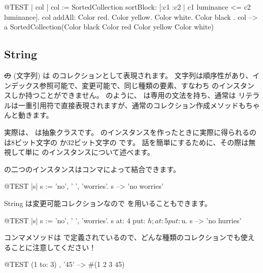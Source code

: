 \documentclass[a4paper,10pt,twoside]{book}
\begin{document}
\begin{code}{@TEST | col |}
col := SortedCollection sortBlock: [:c1 :c2 | c1 luminance <= c2 luminance].
col addAll: { Color red. Color yellow. Color white. Color black }.
col --> a SortedCollection(Color black Color red Color yellow Color white)
\end{code}

\subsection{String}
\st の (文字列) は  のコレクションとして表現されます。
文字列は順序性があり、インデックス参照可能で、変更可能で、同じ種類の要素、すなわち  のインスタンスしか持つことができません。
 のように、 は専用の文法を持ち、通常は  リテラルは一重引用符で直接表現されますが、通常のコレクション作成メソッドもちゃんと動きます。


実際は、 は抽象クラスです。
 のインスタンスを作ったときに実際に得られるのは8ビット文字の  か32ビット文字の  です。
話を簡単にするために、その際は無視して単に  のインスタンスについて述べます。

 の二つのインスタンスはコンマによって結合できます。
\begin{code}{@TEST |s|}
s := 'no', ' ', 'worries'.
s -->  'no worries'
\end{code}

String は変更可能コレクションなので  を用いることもできます。

\begin{code}{@TEST |s| s := 'no', ' ', 'worries'.}
s at: 4 put: $h; at: 5 put: $u.
s --> 'no hurries'
\end{code}

コンマメソッドは  で定義されているので、どんな種類のコレクションでも使えることに注意してください！
\begin{code}{@TEST}
(1 to: 3) , '45' --> #(1 2 3 $4 $5)
\end{code}
\end{document}
